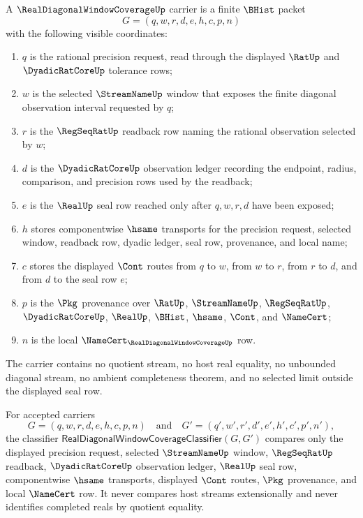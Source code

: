 \begin{definition}
\label{def:real-diagonal-window-coverage-carrier}
A $\RealDiagonalWindowCoverageUp$ carrier is a finite $\BHist$ packet
$$
G=(q,w,r,d,e,h,c,p,n)
$$
with the following visible coordinates:
\begin{enumerate}
\item $q$ is the rational precision request, read through the displayed $\RatUp$ and $\DyadicRatCoreUp$ tolerance rows;
\item $w$ is the selected $\StreamNameUp$ window that exposes the finite diagonal observation interval requested by $q$;
\item $r$ is the $\RegSeqRatUp$ readback row naming the rational observation selected by $w$;
\item $d$ is the $\DyadicRatCoreUp$ observation ledger recording the endpoint, radius, comparison, and precision rows used by the readback;
\item $e$ is the $\RealUp$ seal row reached only after $q,w,r,d$ have been exposed;
\item $h$ stores componentwise $\hsame$ transports for the precision request, selected window, readback row, dyadic ledger, seal row, provenance, and local name;
\item $c$ stores the displayed $\Cont$ routes from $q$ to $w$, from $w$ to $r$, from $r$ to $d$, and from $d$ to the seal row $e$;
\item $p$ is the $\Pkg$ provenance over $\RatUp$, $\StreamNameUp$, $\RegSeqRatUp$, $\DyadicRatCoreUp$, $\RealUp$, $\BHist$, $\hsame$, $\Cont$, and $\NameCert$;
\item $n$ is the local $\NameCert_{\RealDiagonalWindowCoverageUp}$ row.
\end{enumerate}
The carrier contains no quotient stream, no host real equality, no unbounded diagonal stream, no ambient completeness theorem, and no selected limit outside the displayed seal row.
\end{definition}

\begin{definition}
\label{def:real-diagonal-window-coverage-classifier}
For accepted carriers
$$
G=(q,w,r,d,e,h,c,p,n)
\quad\text{and}\quad
G'=(q',w',r',d',e',h',c',p',n'),
$$
the classifier $\mathsf{RealDiagonalWindowCoverageClassifier}(G,G')$ compares only the displayed precision request, selected $\StreamNameUp$ window, $\RegSeqRatUp$ readback, $\DyadicRatCoreUp$ observation ledger, $\RealUp$ seal row, componentwise $\hsame$ transports, displayed $\Cont$ routes, $\Pkg$ provenance, and local $\NameCert$ row. It never compares host streams extensionally and never identifies completed reals by quotient equality.
\end{definition}

